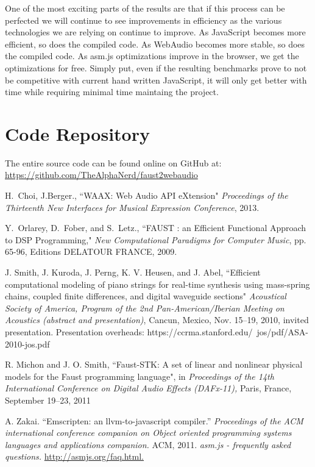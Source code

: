 \documentclass[runningheads,a4paper]{llncs}
\begin{document}
One of the most exciting parts of the results are that if this process can be perfected we will continue to see improvements in efficiency as the various technologies we are relying on continue to improve.  As JavaScript becomes more efficient, so does the compiled code.  As WebAudio becomes more stable, so does the compiled code. As asm.js optimizations improve in the browser, we get the optimizations for free.  Simply put, even if the resulting benchmarks prove to not be competitive with current hand written JavaScript, it will only get better with time while requiring minimal time maintaing the project.

\section{Code Repository}

The entire source code can be found online on GitHub at:
\\
\url{https://github.com/TheAlphaNerd/faust2webaudio}

\begin{thebibliography}{1}
	

    H.~Choi, J.Berger., ``WAAX: Web Audio API eXtension"
    \emph{Proceedings of the Thirteenth New Interfaces for Musical Expression Conference}, 2013.
    
	
     Y.~Orlarey, D.~Fober, and S.~Letz., ``FAUST : an Efficient Functional Approach to DSP Programming,"
    \emph{New Computational Paradigms for Computer Music}, pp. 65-96, Editions DELATOUR FRANCE, 2009.
    
     J. Smith, J. Kuroda, J. Perng, K. V. Heusen, and J. Abel, ``Efficient computational modeling of piano strings for real-time synthesis using mass-spring chains, coupled finite differences, and digital waveguide sections"
    \emph{Acoustical Society of America, Program of the 2nd Pan-American/Iberian Meeting on Acoustics (abstract and presentation)}, Cancun, Mexico, Nov. 15–19, 2010, invited presentation. Presentation overheads: https://ccrma.stanford.edu/~jos/pdf/ASA-2010-jos.pdf

     R. Michon and J. O. Smith, ``Faust-STK: A set of linear and nonlinear physical models for the Faust programming language", in
    \emph{Proceedings of the 14th International Conference on Digital Audio Effects (DAFx-11),} Paris, France, September 19–23, 2011

    A. Zakai. ``Emscripten: an llvm-to-javascript compiler.''
    \emph{Proceedings of the ACM international conference companion on Object oriented programming systems languages and applications companion.} ACM, 2011.
	\textsl{asm.js - frequently asked questions.}
    \newblock \url{http://asmjs.org/faq.html.}
    
    
	
\end{thebibliography}
\end{document}
